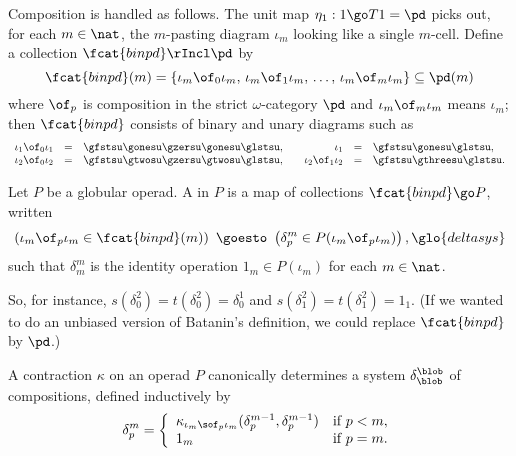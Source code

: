 Composition is handled as follows.  The unit map $\eta_1: 1 \go T1 = \pd$
picks out, for each $m\in\nat$, the $m$-pasting diagram $\iota_m$ looking
like a single $m$-cell.  Define 
a collection $\fcat{binpd} \rIncl \pd$%
%
%
by
\[
\fcat{binpd}(m)
=
\{ \iota_m \of_0 \iota_m,\,
\iota_m \of_1 \iota_m,\,
\ldots,\,
\iota_m \of_m \iota_m \}
\subseteq \pd(m)
\]
where $\of_p$ is composition in the strict $\omega$-category $\pd$ and
$\iota_m \of_m \iota_m$ means $\iota_m$; then $\fcat{binpd}$
consists of binary and unary diagrams such as
\[
\begin{array}{rclcrcl}
\iota_1 \of_0 \iota_1 &= &
\gfstsu\gonesu\gzersu\gonesu\glstsu,	&&
\iota_1 &=&
\gfstsu\gonesu\glstsu,	\\
\iota_2 \of_0 \iota_2 &= & 
\gfstsu\gtwosu\gzersu\gtwosu\glstsu,	&&	
\iota_2 \of_1 \iota_2 &= &
\gfstsu\gthreesu\glstsu.
\end{array}
\]
% 
\begin{defn}
Let $P$ be a globular operad.  A 
in $P$ is a map of collections $\fcat{binpd} \go P$, written
\[
\left(\iota_m \of_p \iota_m	\in \fcat{binpd}(m) \right)
\ \goesto\ 
\left(\delta^m_p \in P(\iota_m \of_p \iota_m)\right),%
% 
\glo{deltasys}
% 
\]
such that $\delta^m_m$ is the identity operation $1_m \in P(\iota_m)$ for
each $m\in\nat$.  
\end{defn}
%
So, for instance, $s(\delta^2_0) = t(\delta^2_0) = \delta^1_0$ and
$s(\delta^2_1) = t(\delta^2_1) = 1_1$.  (If we wanted to do an unbiased
version of Batanin's definition, we could replace $\fcat{binpd}$ by
$\pd$.)  

\begin{example}	
A contraction $\kappa$ on an operad $P$ canonically determines a system
$\delta^\blob_\blob$ of compositions, defined inductively by
\[
\delta^m_p =
\left\{
\begin{array}{ll}
\kappa_{\iota_m \sof_p \iota_m} (\delta^{m-1}_p, \delta^{m-1}_p)	&
\textrm{if }
p < m,	\\
1_m	&
\textrm{if }
p = m.
\end{array}
\right.
\]
\end{example}

